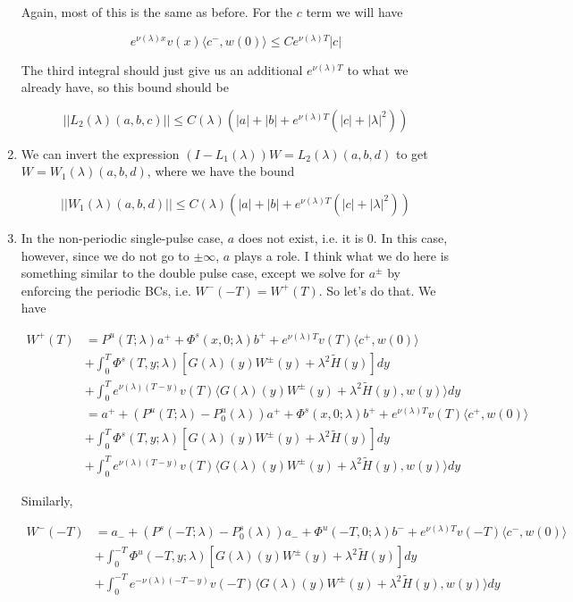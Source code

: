 \documentclass[12pt]{article}
\begin{document}
\begin{enumerate}
Again, most of this is the same as before. For the $c$ term we will have

\[
e^{\nu(\lambda)x} v(x) \langle c^-, w(0) \rangle \leq C e^{\nu(\lambda)T} |c|  
\]

The third integral should just give us an additional $e^{\nu(\lambda)T}$ to what we already have, so this bound should be

\[
||L_2(\lambda)(a,b,c)|| \leq C(\lambda) (|a| + |b| + e^{\nu(\lambda)T}(|c| + |\lambda|^2))
\]

\item We can invert the expression $(I - L_1(\lambda))W = L_2(\lambda)(a,b,d)$ to get $W = W_1(\lambda)(a,b,d)$, where we have the bound

\[
||W_1(\lambda)(a,b,d)|| \leq C(\lambda) (|a| + |b| + e^{\nu(\lambda)T}(|c| + |\lambda|^2))
\]

\item In the non-periodic single-pulse case, $a$ does not exist, i.e. it is 0. In this case, however, since we do not go to $\pm \infty$, $a$ plays a role. I think what we do here is something similar to the double pulse case, except we solve for $a^\pm$ by enforcing the periodic BCs, i.e. $W^-(-T) = W^+(T)$. So let's do that. We have 

\begin{align*}
W^+(T) &= P^u(T; \lambda)a^+ + \Phi^s(x, 0; \lambda)b^+ + e^{\nu(\lambda)T} v(T) \langle c^+, w(0) \rangle  \\
&+ \int_0^T \Phi^s(T, y; \lambda) [ G(\lambda)(y)W^\pm(y) + \lambda^2 \tilde{H}(y) ] dy \\
&+ \int_0^T 
e^{\nu(\lambda)(T-y)} v(T) \langle G(\lambda)(y)W^\pm(y) + \lambda^2 \tilde{H}(y), w(y) \rangle  dy \\
&= a^+ + (P^u(T; \lambda) - P^u_0(\lambda))a^+ + \Phi^s(x, 0; \lambda)b^+ + e^{\nu(\lambda)T} v(T) \langle c^+, w(0) \rangle  \\
&+ \int_0^T \Phi^s(T, y; \lambda) [ G(\lambda)(y)W^\pm(y) + \lambda^2 \tilde{H}(y) ] dy \\
&+ \int_0^T 
e^{\nu(\lambda)(T-y)} v(T) \langle G(\lambda)(y)W^\pm(y) + \lambda^2 \tilde{H}(y), w(y) \rangle  dy 
\end{align*}

Similarly,

\begin{align*}
W^-(-T) &= a_- + (P^s(-T; \lambda) - P^s_0(\lambda))a_- + \Phi^u(-T, 0; \lambda)b^- + e^{\nu(\lambda)T} v(-T) \langle c^-, w(0) \rangle  \\
&+ \int_0^{-T} \Phi^u(-T, y; \lambda)[ G(\lambda)(y)W^\pm(y) + \lambda^2 \tilde{H}(y) ] dy \\
&+ \int_0^{-T} 
e^{-\nu(\lambda)(-T-y)} v(-T) \langle G(\lambda)(y)W^\pm(y) + \lambda^2 \tilde{H}(y), w(y) \rangle dy 
\end{align*}


\end{enumerate}
\end{document}
